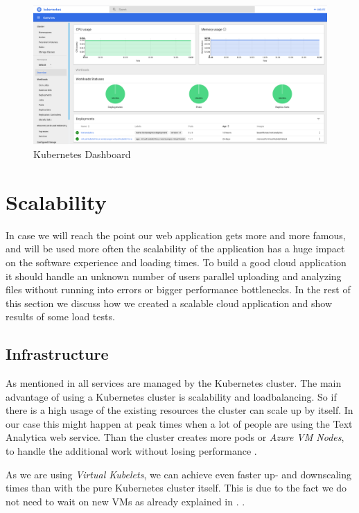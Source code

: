 \documentclass[conference]{IEEEtran}
\begin{document}
\begin{figure}[ht!]
\includegraphics[width=170mm]{img/Kubernetes_Dashboard.png}
\caption{Kubernetes Dashboard}
\label{img:kubernetes-dashboard}
\end{figure}

\section{Scalability}
\label{sec:scalability}
In case we will reach the point our web application gets more and more famous, and will be used more often the scalability of the application has a huge impact on the software experience and loading times. To build a good cloud application it should handle an unknown number of users parallel uploading and analyzing files without running into errors or bigger performance bottlenecks. In the rest of this section we discuss how we created a scalable cloud application and show results of some load tests.

\subsection{Infrastructure}
As mentioned in  all services are managed by the Kubernetes cluster.
The main advantage of using a Kubernetes cluster is scalability and loadbalancing. So if there is a high usage of the
existing resources the cluster can scale up by itself. In our case this might happen at peak times when a lot of people
are using the Text Analytica web service. Than the cluster creates more pods or \textit{Azure VM Nodes}, to handle the additional work without losing performance \cite{MicrosoftAzureKubernetesService}.

As we are using \textit{Virtual Kubelets}, we can achieve even faster up- and downscaling times
than with the pure Kubernetes cluster itself. This is due to the fact we do not need to wait on new VMs as already explained in .
\cite{MicrosoftVirtualNode}.
\end{document}

